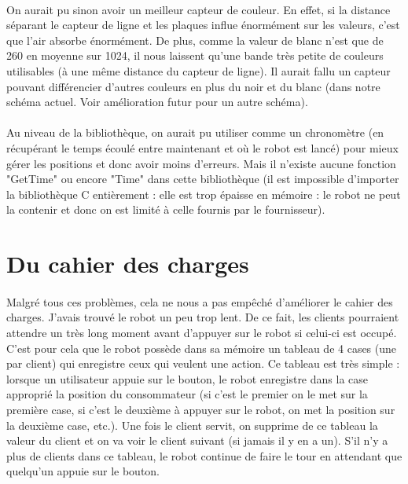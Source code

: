 \documentclass[12pt,oneside,a4paper]{book}
\begin{document}
	\paragraph{} On aurait pu sinon avoir un meilleur capteur de couleur. En effet, si la distance séparant le capteur de ligne et les plaques influe énormément sur les valeurs, c'est que l'air absorbe énormément. De plus, comme la valeur de blanc n'est que de 260 en moyenne sur 1024, il nous laissent qu'une bande très petite de couleurs utilisables (à une même distance du capteur de ligne). Il aurait fallu un capteur pouvant différencier d'autres couleurs en plus du noir et du blanc (dans notre schéma actuel. Voir amélioration futur pour un autre schéma).
	\paragraph{} Au niveau de la bibliothèque, on aurait pu utiliser comme un chronomètre (en récupérant le temps écoulé entre maintenant et où le robot est lancé) pour mieux gérer les positions et donc avoir moins d'erreurs. Mais il n'existe aucune fonction "GetTime" ou encore "Time" dans cette bibliothèque (il est impossible d'importer la bibliothèque C entièrement : elle est trop épaisse en mémoire : le robot ne peut la contenir et donc on est limité à celle fournis par le fournisseur).

\section{Du cahier des charges}
	\paragraph{} Malgré tous ces problèmes, cela ne nous a pas empêché d'améliorer le cahier des charges. J'avais trouvé le robot un peu trop lent. De ce fait, les clients pourraient attendre un très long moment avant d'appuyer sur le robot si celui-ci est occupé. C'est pour cela que le robot possède dans sa mémoire un tableau de 4 cases (une par client) qui enregistre ceux qui veulent une action. Ce tableau est très simple : lorsque un utilisateur appuie sur le bouton, le robot enregistre dans la case approprié la position du consommateur (si c'est le premier on le met sur la première case, si c'est le deuxième à appuyer sur le robot, on met la position sur la deuxième case, etc.). Une fois le client servit, on supprime de ce tableau la valeur du client et on va voir le client suivant (si jamais il y en a un). S'il n'y a plus de clients dans ce tableau, le robot continue de faire le tour en attendant que quelqu'un appuie sur le bouton.
\end{document}
